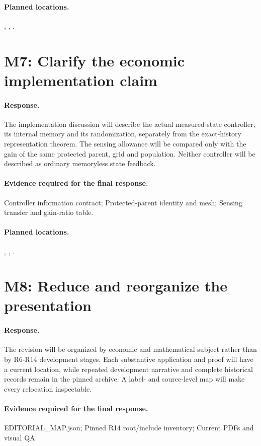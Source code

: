 \paragraph*{Planned locations.} , , .

\section*{M7: Clarify the economic implementation claim}
\paragraph*{Response.} The implementation discussion will describe the actual measured-state controller, its internal memory and its randomization, separately from the exact-history representation theorem. The sensing allowance will be compared only with the gain of the same protected parent, grid and population. Neither controller will be described as ordinary memoryless state feedback.
\paragraph*{Evidence required for the final response.} Controller information contract; Protected-parent identity and mesh; Sensing transfer and gain-ratio table.
\paragraph*{Planned locations.} , , .

\section*{M8: Reduce and reorganize the presentation}
\paragraph*{Response.} The revision will be organized by economic and mathematical subject rather than by R6-R14 development stages. Each substantive application and proof will have a current location, while repeated development narrative and complete historical records remain in the pinned archive. A label- and source-level map will make every relocation inspectable.
\paragraph*{Evidence required for the final response.} EDITORIAL\_MAP.json; Pinned R14 root/include inventory; Current PDFs and visual QA.
